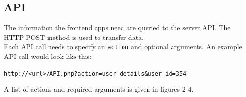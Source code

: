 \documentclass[12pt]{scrartcl}
\begin{document}
\subsection{API}

The information the frontend apps need are queried to the server API. The HTTP POST method is used to transfer data. \\
Each API call needs to specify an \texttt{action} and optional arguments. An example API call would look like this:\\
\begin{center}
	\texttt{http://<url>/API.php?action=user\_details\&user\_id=354}
\end{center}

A list of actions and required arguments is given in figures 2-4.\\
\end{document}

